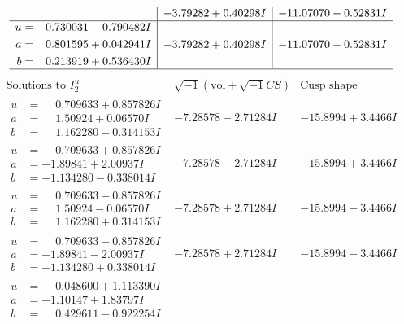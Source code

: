 \documentclass[1p]{elsarticle_modified}
\theoremstyle{definition}
\newcommand{\I}{\sqrt{-1}}
\begin{document}
$$\begin{array}{c|c|c}
 & -3.79282 + 0.40298 I & -11.07070 - 0.52831 I \\ \hline\begin{aligned}
u &= -0.730031 - 0.790482 I \\
a &= \phantom{-}0.801595 + 0.042941 I \\
b &= \phantom{-}0.213919 + 0.536430 I\end{aligned}
 & -3.79282 + 0.40298 I & -11.07070 - 0.52831 I\\
 \hline 
 \end{array}$$\newpage$$\begin{array}{c|c|c}  
\text{Solutions to }I^u_{2}& \I (\text{vol} + \sqrt{-1}CS) & \text{Cusp shape}\\
 \hline 
\begin{aligned}
u &= \phantom{-}0.709633 + 0.857826 I \\
a &= \phantom{-}1.50924 + 0.06570 I \\
b &= \phantom{-}1.162280 - 0.314153 I\end{aligned}
 & -7.28578 - 2.71284 I & -15.8994 + 3.4466 I \\ \hline\begin{aligned}
u &= \phantom{-}0.709633 + 0.857826 I \\
a &= -1.89841 + 2.00937 I \\
b &= -1.134280 - 0.338014 I\end{aligned}
 & -7.28578 - 2.71284 I & -15.8994 + 3.4466 I \\ \hline\begin{aligned}
u &= \phantom{-}0.709633 - 0.857826 I \\
a &= \phantom{-}1.50924 - 0.06570 I \\
b &= \phantom{-}1.162280 + 0.314153 I\end{aligned}
 & -7.28578 + 2.71284 I & -15.8994 - 3.4466 I \\ \hline\begin{aligned}
u &= \phantom{-}0.709633 - 0.857826 I \\
a &= -1.89841 - 2.00937 I \\
b &= -1.134280 + 0.338014 I\end{aligned}
 & -7.28578 + 2.71284 I & -15.8994 - 3.4466 I \\ \hline\begin{aligned}
u &= \phantom{-}0.048600 + 1.113390 I \\
a &= -1.10147 + 1.83797 I \\
b &= \phantom{-}0.429611 - 0.922254 I\end{aligned}

\end{array}$$
\end{document}
